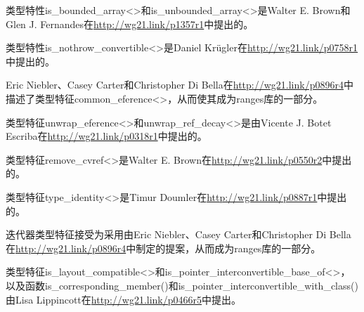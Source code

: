 类型特性is\_bounded\_array<>和is\_unbounded\_array<>是Walter E. Brown和Glen J. Fernandes在\url{http://wg21.link/p1357r1}中提出的。

类型特性is\_nothrow\_convertible<>是Daniel Kr{\"u}gler在\url{http://wg21.link/p0758r1}中提出的。

Eric Niebler、Casey Carter和Christopher Di Bella在\url{http://wg21.link/p0896r4}中描述了类型特征common\_eference<>，从而使其成为ranges库的一部分。

类型特征unwrap\_eference<>和unwrap\_ref\_decay<>是由Vicente J. Botet Escriba在\url{http://wg21.link/p0318r1}中提出的。

类型特征remove\_cvref<>是Walter E. Brown在\url{http://wg21.link/p0550r2}中提出的。

类型特征type\_identity<>是Timur Doumler在\url{http://wg21.link/p0887r1}中提出的。

迭代器类型特征接受为采用由Eric Niebler、Casey Carter和Christopher Di Bella在\url{http://wg21.link/p0896r4}中制定的提案，从而成为ranges库的一部分。

类型特征is\_layout\_compatible<>和is\_pointer\_interconvertible\_base\_of<>，以及函数is\_corresponding\_member()和is\_pointer\_interconvertible\_with\_class()由Lisa Lippincott在\url{http://wg21.link/p0466r5}中提出。